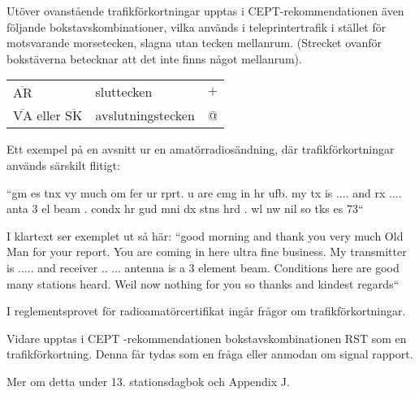 Utöver ovanstående trafikförkortningar upptas i CEPT-rekommendationen
även följande bokstavskombinationer, vilka används i teleprintertrafik
i stället för motsvarande morsetecken, slagna utan tecken mellanrum.
(Strecket ovanför bokstäverna betecknar att det inte finns något
mellanrum).

\begin{tabular}{lll}
  \(\overline{\mathrm{AR}}\) & sluttecken & \(+\) \\
  \(\overline{\mathrm{VA}}\) eller \(\overline{\mathrm{SK}}\) & avslutningstecken & @ \\
\end{tabular}

Ett exempel på en avsnitt ur en amatörradiosändning, där
trafikförkortningar används särskilt flitigt:

``gm es tnx vy much om fer ur rprt. u are cmg in hr ufb. my tx is
.... and rx .... anta 3 el beam . condx hr gud mni dx stns hrd . wl nw
nil so tks es 73``

I klartext ser exemplet ut så här: ``good morning and thank you very
much Old Man for your report. You are coming in here ultra fine
business. My transmitter is .....  and receiver .. ... antenna is a 3
element beam. Conditions here are good many stations heard. Weil now
nothing for you so thanks and kindest regards``

I reglementsprovet för radioamatörcertifikat ingår frågor om
trafikförkortningar.

Vidare upptas i CEPT -rekommendationen bokstavskombinationen RST som
en trafikförkortning. Denna får tydas som en fråga eller anmodan om
signal rapport.

Mer om detta under 13. stationsdagbok och Appendix J.
